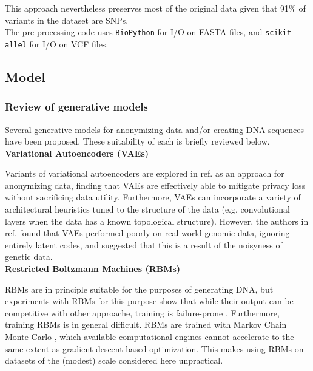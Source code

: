 \documentclass[11pt]{article}
\begin{document}
This approach nevertheless preserves most of the original data given that 91\% of 
variants in the dataset are SNPs. \\


The pre-processing code uses \texttt{BioPython} \cite{cock2009biopython} for I/O on FASTA files,
and \texttt{scikit-allel} \cite{miles2017scikit} for I/O on VCF files.

\subsection{Model}

\subsubsection{Review of generative models}

Several generative models for anonymizing data and/or creating DNA sequences
have been proposed. These suitability of each is briefly reviewed below. \\ 

\textbf{Variational Autoencoders (VAEs)}

Variants of variational autoencoders are explored in ref. \cite{chen2018differentially} as an approach for anonymizing data, finding that VAEs are effectively able to mitigate
privacy loss without sacrificing data utility. 
Furthermore, VAEs can incorporate a variety of architectural heuristics tuned to the 
structure of the data (e.g. convolutional layers when the data has a known topological 
structure).
However, the authors in ref. \cite{killoran2017generating} found that VAEs performed 
poorly on real world genomic data, ignoring entirely latent codes, and suggested that
 this is a result of the noisyness of genetic data. \\


\textbf{Restricted Boltzmann Machines (RBMs)}

RBMs are in principle suitable for the purposes of generating DNA, but experiments with 
RBMs for this purpose show that while their output can be competitive with other approache,
training is failure-prone \cite{yelmen2019creating}. 
Furthermore, training RBMs is in general difficult. RBMs are trained with 
Markov Chain Monte Carlo \cite{fischer2014training}, which available computational engines cannot accelerate to the same extent as gradient descent based optimization. 
This makes using RBMs on datasets of the (modest) scale considered here unpractical. \\
\end{document}
